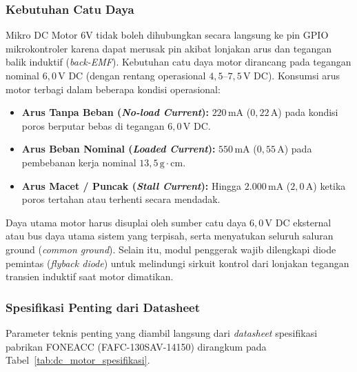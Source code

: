 \subsubsection{Kebutuhan Catu Daya}
Mikro DC Motor 6V tidak boleh dihubungkan secara langsung ke pin GPIO mikrokontroler karena dapat merusak pin akibat lonjakan arus dan tegangan balik induktif (\textit{back-EMF}). Kebutuhan catu daya motor dirancang pada tegangan nominal $6{,}0\,\text{V DC}$ (dengan rentang operasional $4{,}5\text{--}7{,}5\,\text{V DC}$). Konsumsi arus motor terbagi dalam beberapa kondisi operasional:
\begin{itemize}
	\item \textbf{Arus Tanpa Beban (\textit{No-load Current}):} $220\,\text{mA}$ ($0{,}22\,\text{A}$) pada kondisi poros berputar bebas di tegangan $6{,}0\,\text{V DC}$.
	\item \textbf{Arus Beban Nominal (\textit{Loaded Current}):} $550\,\text{mA}$ ($0{,}55\,\text{A}$) pada pembebanan kerja nominal $13{,}5\,\text{g}\cdot\text{cm}$.
	\item \textbf{Arus Macet / Puncak (\textit{Stall Current}):} Hingga $2.000\,\text{mA}$ ($2{,}0\,\text{A}$) ketika poros tertahan atau terhenti secara mendadak.
\end{itemize}

Daya utama motor harus disuplai oleh sumber catu daya $6{,}0\,\text{V DC}$ eksternal atau bus daya utama sistem yang terpisah, serta menyatukan seluruh saluran ground (\textit{common ground}). Selain itu, modul penggerak wajib dilengkapi diode pemintas (\textit{flyback diode}) untuk melindungi sirkuit kontrol dari lonjakan tegangan transien induktif saat motor dimatikan.

\subsubsection{Spesifikasi Penting dari Datasheet}
Parameter teknis penting yang diambil langsung dari \textit{datasheet} spesifikasi pabrikan FONEACC (FAFC-130SAV-14150) dirangkum pada Tabel~\ref{tab:dc_motor_spesifikasi}.

